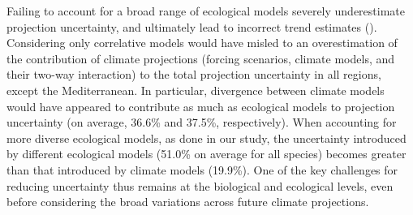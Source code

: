 \documentclass[11pt,letter]{article}
\begin{document}

Failing to account for a broad range of ecological models severely underestimate projection uncertainty, and ultimately lead to incorrect trend estimates (). Considering only correlative models would have misled to an overestimation of the contribution of climate projections (forcing scenarios, climate models, and their two-way interaction) to the total projection uncertainty in all regions, except the Mediterranean. In particular, divergence between climate models would have appeared to contribute as much as ecological models to projection uncertainty (on average, 36.6\% and 37.5\%, respectively). When accounting for more diverse ecological models, as done in our study, the uncertainty introduced by different ecological models (51.0\% on average for all species) becomes greater than that introduced by climate models (19.9\%). One of the key challenges for reducing uncertainty thus remains at the biological and ecological levels, even before considering the broad variations across future climate projections.

\end{document}
